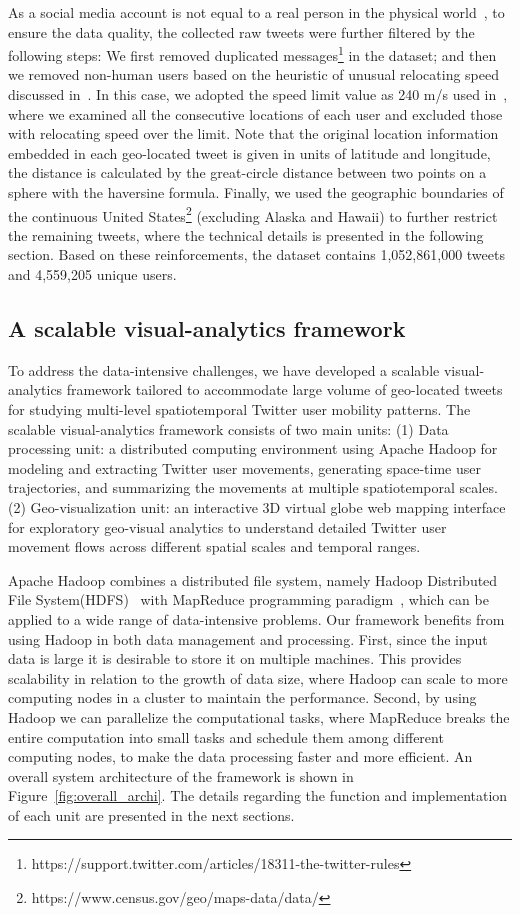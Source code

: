 \documentclass[ijgi,article,accept,moreauthors,pdftex,10pt,a4paper]{mdpi}
\theoremstyle{mdpi}
\newcounter{ex}
\newcounter{re}
\theoremstyle{mdpidefinition}
\begin{document}
As a social media account is not equal to a real person in the physical world~\cite{tsou2015}, to ensure the data quality, the collected raw tweets were further filtered by the following steps: We first removed duplicated messages\footnote{https://support.twitter.com/articles/18311-the-twitter-rules} in the dataset; and then we removed non-human users based on the heuristic of unusual relocating speed discussed in~\cite{hawelka2014geo,Jurdak2015}. 
In this case, we adopted the speed limit value as 240 m/s used in~\cite{Jurdak2015}, where we examined all the consecutive locations of each user and excluded those with relocating speed over the limit.
Note that the original location information embedded in each geo-located tweet is given in units of latitude and longitude, the distance is calculated by the great-circle distance between two points on a sphere with the haversine formula.
Finally, we used the geographic boundaries of the continuous United States\footnote{https://www.census.gov/geo/maps-data/data/} (excluding Alaska and Hawaii) to further restrict the remaining tweets, where the technical details is presented in the following section. Based on these reinforcements, the dataset contains 1,052,861,000 tweets and 4,559,205 unique users.

\subsection{A scalable visual-analytics framework}
To address the data-intensive challenges, we have developed a scalable visual-analytics framework tailored to accommodate large volume of geo-located tweets for studying multi-level spatiotemporal Twitter user mobility patterns.
The scalable visual-analytics framework consists of two main units: (1) Data processing unit: a distributed computing environment using Apache Hadoop for modeling and extracting Twitter user movements, generating space-time user trajectories, and summarizing the movements at multiple spatiotemporal scales.
(2) Geo-visualization unit: an interactive 3D virtual globe web mapping interface for exploratory geo-visual analytics to understand detailed Twitter user movement flows across different spatial scales and temporal ranges. 

Apache Hadoop combines a distributed file system, namely Hadoop Distributed File System(HDFS)~\cite{shvachko2010hadoop} with MapReduce programming paradigm~\cite{dean2008mapreduce}, which can be applied to a wide range of data-intensive problems.
Our framework benefits from using Hadoop in both data management and processing.
First, since the input data is large it is desirable to store it on multiple machines.
This provides scalability in relation to the growth of data size, where Hadoop can scale to more computing nodes in a cluster to maintain the performance.
Second, by using Hadoop we can parallelize the computational tasks, where MapReduce breaks the entire computation into small tasks and schedule them among different computing nodes, to make the data processing faster and more efficient.
An overall system architecture of the framework is shown in Figure~\ref{fig:overall_archi}.
The details regarding the function and implementation of each unit are presented in the next sections.
\end{document}
